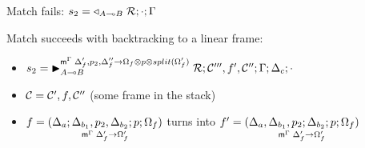 
\item Match fails: $s_2 = \contstate{A \lolli B}{\rulestk}{\cdot}{\Gamma}$

\item Match succeeds with backtracking to a linear frame:
\begin{itemize}
   \item $s_2 = \matstate{A \lolli B}{\rulestk}{\lstack{C'''}, f',
      \lstack{C''}}{\Gamma}{\Delta_c}{\cdot}{\Delta'_f, p_2, \Delta''_f \rightarrow
      \Omega_f \otimes p \otimes split(\Omega'_f)}$

   \item $\lstack{C} = \lstack{C'}, f, \lstack{C''}$ (some frame in the stack)

   \item $f = \lframe{\Delta_a}{\Delta_{b_1}, p_2, \Delta_{b_2}}{p}{\Omega_f}{\Delta_f'}{\Omega_f'}$
   turns into $f' = \lframe{\Delta_a, \Delta_{b_1},
      p_2}{\Delta_{b_2}}{p}{\Omega_f}{\Delta'_f}{\Omega'_f}$

\end{itemize}
